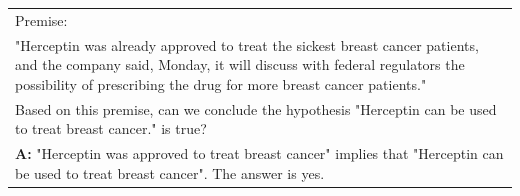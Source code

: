 \documentclass{article} %
\begin{document}
\begin{table}[h]
\begin{tabular}{p{14cm}}
        Premise:\\
        "Herceptin was already approved to treat the sickest breast cancer patients, and the company said, Monday, it will discuss with federal regulators the possibility of prescribing the drug for more breast cancer patients."\\
        Based on this premise, can we conclude the hypothesis "Herceptin can be used to treat breast cancer." is true?\\
        \vspace{-1mm}
        \textbf{A:} "Herceptin was approved to treat breast cancer" implies that "Herceptin can be used to treat breast cancer". The answer is yes.\\
        \bottomrule
    \end{tabular}
    \label{tab:prompt-rte}
\end{table}



\end{document}
